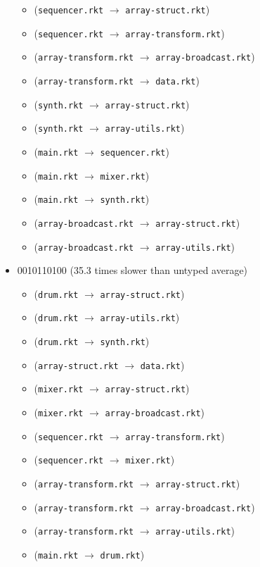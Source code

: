 \documentclass{article}
\newcommand{\mono}[1]{\texttt{#1}}
\begin{document}
\begin{itemize}
\begin{itemize}
  \item (\mono{sequencer.rkt} $\rightarrow$ \mono{array-struct.rkt})
  \item (\mono{sequencer.rkt} $\rightarrow$ \mono{array-transform.rkt})
  \item (\mono{array-transform.rkt} $\rightarrow$ \mono{array-broadcast.rkt})
  \item (\mono{array-transform.rkt} $\rightarrow$ \mono{data.rkt})
  \item (\mono{synth.rkt} $\rightarrow$ \mono{array-struct.rkt})
  \item (\mono{synth.rkt} $\rightarrow$ \mono{array-utils.rkt})
  \item (\mono{main.rkt} $\rightarrow$ \mono{sequencer.rkt})
  \item (\mono{main.rkt} $\rightarrow$ \mono{mixer.rkt})
  \item (\mono{main.rkt} $\rightarrow$ \mono{synth.rkt})
  \item (\mono{array-broadcast.rkt} $\rightarrow$ \mono{array-struct.rkt})
  \item (\mono{array-broadcast.rkt} $\rightarrow$ \mono{array-utils.rkt})
  \end{itemize}
\item 0010110100 (35.3 times slower than untyped average)
  \begin{itemize}
  \item (\mono{drum.rkt} $\rightarrow$ \mono{array-struct.rkt})
  \item (\mono{drum.rkt} $\rightarrow$ \mono{array-utils.rkt})
  \item (\mono{drum.rkt} $\rightarrow$ \mono{synth.rkt})
  \item (\mono{array-struct.rkt} $\rightarrow$ \mono{data.rkt})
  \item (\mono{mixer.rkt} $\rightarrow$ \mono{array-struct.rkt})
  \item (\mono{mixer.rkt} $\rightarrow$ \mono{array-broadcast.rkt})
  \item (\mono{sequencer.rkt} $\rightarrow$ \mono{array-transform.rkt})
  \item (\mono{sequencer.rkt} $\rightarrow$ \mono{mixer.rkt})
  \item (\mono{array-transform.rkt} $\rightarrow$ \mono{array-struct.rkt})
  \item (\mono{array-transform.rkt} $\rightarrow$ \mono{array-broadcast.rkt})
  \item (\mono{array-transform.rkt} $\rightarrow$ \mono{array-utils.rkt})
  \item (\mono{main.rkt} $\rightarrow$ \mono{drum.rkt})

\end{itemize}
\end{itemize}
\end{document}
